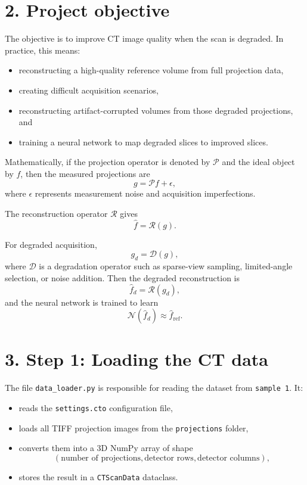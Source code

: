 \documentclass[12pt,a4paper]{article}
\begin{document}
\section*{2. Project objective}
The objective is to improve CT image quality when the scan is degraded. In practice, this means:
\begin{itemize}[leftmargin=*]
\item reconstructing a high-quality reference volume from full projection data,
\item creating difficult acquisition scenarios,
\item reconstructing artifact-corrupted volumes from those degraded projections, and
\item training a neural network to map degraded slices to improved slices.
\end{itemize}

Mathematically, if the projection operator is denoted by $\mathcal{P}$ and the ideal object by $f$, then the measured projections are
\[
g = \mathcal{P}f + \epsilon,
\]
where $\epsilon$ represents measurement noise and acquisition imperfections.

The reconstruction operator $\mathcal{R}$ gives
\[
\hat{f} = \mathcal{R}(g).
\]

For degraded acquisition,
\[
g_d = \mathcal{D}(g),
\]
where $\mathcal{D}$ is a degradation operator such as sparse-view sampling, limited-angle selection, or noise addition. Then the degraded reconstruction is
\[
\hat{f}_d = \mathcal{R}(g_d),
\]
and the neural network is trained to learn
\[
\mathcal{N}(\hat{f}_d) \approx \hat{f}_{\text{ref}}.
\]

\section*{3. Step 1: Loading the CT data}
The file \texttt{data\_loader.py} is responsible for reading the dataset from \texttt{sample 1}. It:
\begin{itemize}[leftmargin=*]
\item reads the \texttt{settings.cto} configuration file,
\item loads all TIFF projection images from the \texttt{projections} folder,
\item converts them into a 3D NumPy array of shape
\[
(\text{number of projections}, \text{detector rows}, \text{detector columns}),
\]
\item stores the result in a \texttt{CTScanData} dataclass.
\end{itemize}
\end{document}
